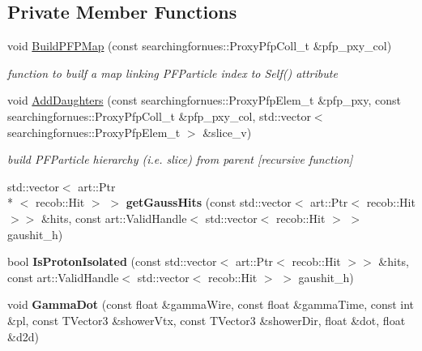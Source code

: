 \subsection*{Private Member Functions}
\begin{DoxyCompactItemize}
\item 
void \hyperlink{classSecondShowerPurity_a740e87a9a228f255bca15d2f04505aa9}{Build\-P\-F\-P\-Map} (const searchingfornues\-::\-Proxy\-Pfp\-Coll\-\_\-t \&pfp\-\_\-pxy\-\_\-col)
\begin{DoxyCompactList}\small\item\em function to builf a map linking P\-F\-Particle index to Self() attribute \end{DoxyCompactList}\item 
void \hyperlink{classSecondShowerPurity_a91a362195490bc158713e4ed84ed0fa2}{Add\-Daughters} (const searchingfornues\-::\-Proxy\-Pfp\-Elem\-\_\-t \&pfp\-\_\-pxy, const searchingfornues\-::\-Proxy\-Pfp\-Coll\-\_\-t \&pfp\-\_\-pxy\-\_\-col, std\-::vector$<$ searchingfornues\-::\-Proxy\-Pfp\-Elem\-\_\-t $>$ \&slice\-\_\-v)
\begin{DoxyCompactList}\small\item\em build P\-F\-Particle hierarchy (i.\-e. slice) from parent \mbox{[}recursive function\mbox{]} \end{DoxyCompactList}\item 
\hypertarget{classSecondShowerPurity_ad2c997fc6ccdea277c14cfcad5c83243}{std\-::vector$<$ art\-::\-Ptr\\*
$<$ recob\-::\-Hit $>$ $>$ {\bfseries get\-Gauss\-Hits} (const std\-::vector$<$ art\-::\-Ptr$<$ recob\-::\-Hit $>$$>$ \&hits, const art\-::\-Valid\-Handle$<$ std\-::vector$<$ recob\-::\-Hit $>$ $>$ gaushit\-\_\-h)}\label{classSecondShowerPurity_ad2c997fc6ccdea277c14cfcad5c83243}

\item 
\hypertarget{classSecondShowerPurity_aca45d8671bf9d292eed1ed00a80329b1}{bool {\bfseries Is\-Proton\-Isolated} (const std\-::vector$<$ art\-::\-Ptr$<$ recob\-::\-Hit $>$$>$ \&hits, const art\-::\-Valid\-Handle$<$ std\-::vector$<$ recob\-::\-Hit $>$ $>$ gaushit\-\_\-h)}\label{classSecondShowerPurity_aca45d8671bf9d292eed1ed00a80329b1}

\item 
\hypertarget{classSecondShowerPurity_ac3aa736b52623968b984814ac75d6510}{void {\bfseries Gamma\-Dot} (const float \&gamma\-Wire, const float \&gamma\-Time, const int \&pl, const T\-Vector3 \&shower\-Vtx, const T\-Vector3 \&shower\-Dir, float \&dot, float \&d2d)}\label{classSecondShowerPurity_ac3aa736b52623968b984814ac75d6510}

\end{DoxyCompactItemize}

